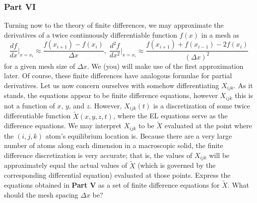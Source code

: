 \documentclass[letterpaper,12pt]{article}
\newcommand*{\deriv}[2]{\frac{d #1}{d #2}}
\newcommand*{\nderiv}[3]{\frac{d^{#3} #1}{d #2^{#3}}}
\begin{document}
\begin{flushleft}
    \subsubsection*{Part VI}
    Turning now to the theory of finite differences, we may approximate the derivatives of a twice continuously differentiable function $f(x)$ in a mesh as
    $$\deriv{f}{x}\bigg|_{x=x_i} \approx \frac{f(x_{i+1}) - f(x_i)}{\Delta x}, \; \nderiv{f}{x}{2}\bigg|_{x=x_i} \approx \frac{f(x_{i+1}) + f(x_{i-1}) - 2f(x_i)}{\left(\Delta x\right)^2}$$
    for a given mesh size of $\Delta x$. We (you) will make use of the first approximation later. Of course, these finite differences have analogous formulae for partial derivatives.\newline\newline
    Let us now concern ourselves with somehow differentiating $X_{ijk}$. As it stands, the equations appear to be finite difference equations, however $X_{ijk}$ this is not a function of $x$, $y$, and $z$. However, $X_{ijk}(t)$ is a discretization of some twice differentiable function $\tilde{X}(x, y, z, t)$, where the EL equations serve as the difference equations. We may interpret $X_{ijk}$ to be $\tilde{X}$ evaluated at the point where the $(i, j, k)$ atom's equilibrium location is. Because there are a very large number of atoms along each dimension in a macroscopic solid, the finite difference discretization is very accurate; that is, the values of $X_{ijk}$ will be approximately equal the actual values of $\tilde{X}$ (which is governed by the corresponding differential equation) evaluated at those points.\newline\newline
    Express the equations obtained in \textbf{Part V} as a set of finite difference equations for $\tilde{X}$. What should the mesh spacing $\Delta x$ be?


\end{flushleft}
\end{document}
